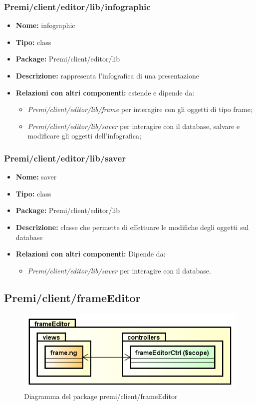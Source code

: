 \subsubsection{Premi/client/editor/lib/infographic}
\begin{itemize}
  \item[] \textbf{Nome:} infographic
  \item[] \textbf{Tipo:} class
  \item[] \textbf{Package:} Premi/client/editor/lib
  \item[] \textbf{Descrizione:} rappresenta l'infografica di una presentazione
  \item[] \textbf{Relazioni con altri componenti:} estende  e dipende da:
\begin{itemize} 
	\item \textit{Premi/client/editor/lib/frame} per interagire con gli oggetti di tipo frame;
	\item \textit{Premi/client/editor/lib/saver} per interagire con il database, salvare e modificare gli oggetti dell'infografica;
\end{itemize}  
\end{itemize}
\subsubsection{Premi/client/editor/lib/saver}
\begin{itemize}
  \item[] \textbf{Nome:} saver
  \item[] \textbf{Tipo:} class
  \item[] \textbf{Package:} Premi/client/editor/lib
  \item[] \textbf{Descrizione:} classe che permette di effettuare le modifiche degli oggetti sul database
  \item[] \textbf{Relazioni con altri componenti:} Dipende da:
\begin{itemize} 
	\item \textit{Premi/client/editor/lib/saver} per interagire con il database.
\end{itemize}  
\end{itemize}


\subsection{Premi/client/frameEditor}
\begin{figure}[!h]
\begin{center}
\includegraphics[scale=0.45]{img/diapkg/frameEditor.png}
\caption{Diagramma del package premi/client/frameEditor}
\end{center}
\end{figure}

